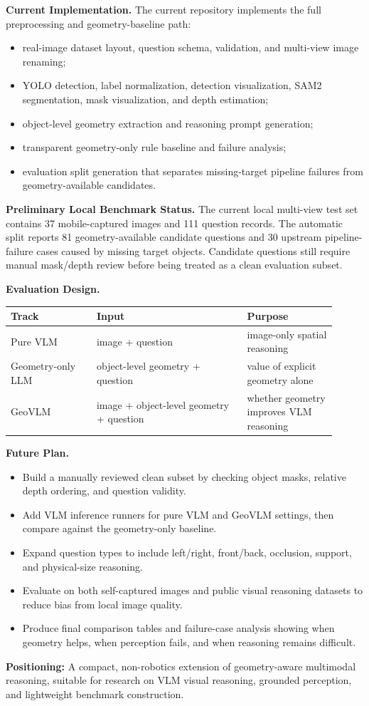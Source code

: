 \documentclass[10pt]{article}
\begin{document}
\textbf{Current Implementation.}
The current repository implements the full preprocessing and geometry-baseline path:
\begin{itemize}
  \item real-image dataset layout, question schema, validation, and multi-view image renaming;
  \item YOLO detection, label normalization, detection visualization, SAM2 segmentation, mask visualization, and depth estimation;
  \item object-level geometry extraction and reasoning prompt generation;
  \item transparent geometry-only rule baseline and failure analysis;
  \item evaluation split generation that separates missing-target pipeline failures from geometry-available candidates.
\end{itemize}

\textbf{Preliminary Local Benchmark Status.}
The current local multi-view test set contains 37 mobile-captured images and 111 question records. The automatic split reports 81 geometry-available candidate questions and 30 upstream pipeline-failure cases caused by missing target objects. Candidate questions still require manual mask/depth review before being treated as a clean evaluation subset.

\textbf{Evaluation Design.}
\begin{center}
\small
\begin{tabular}{p{0.24\linewidth}p{0.42\linewidth}p{0.25\linewidth}}
\textbf{Track} & \textbf{Input} & \textbf{Purpose} \\
\hline
Pure VLM & image + question & image-only spatial reasoning \\
Geometry-only LLM & object-level geometry + question & value of explicit geometry alone \\
GeoVLM & image + object-level geometry + question & whether geometry improves VLM reasoning \\
\end{tabular}
\end{center}

\textbf{Future Plan.}
\begin{itemize}
  \item Build a manually reviewed clean subset by checking object masks, relative depth ordering, and question validity.
  \item Add VLM inference runners for pure VLM and GeoVLM settings, then compare against the geometry-only baseline.
  \item Expand question types to include left/right, front/back, occlusion, support, and physical-size reasoning.
  \item Evaluate on both self-captured images and public visual reasoning datasets to reduce bias from local image quality.
  \item Produce final comparison tables and failure-case analysis showing when geometry helps, when perception fails, and when reasoning remains difficult.
\end{itemize}

\vfill
{\footnotesize \textbf{Positioning:} A compact, non-robotics extension of geometry-aware multimodal reasoning, suitable for research on VLM visual reasoning, grounded perception, and lightweight benchmark construction.}
\end{document}
